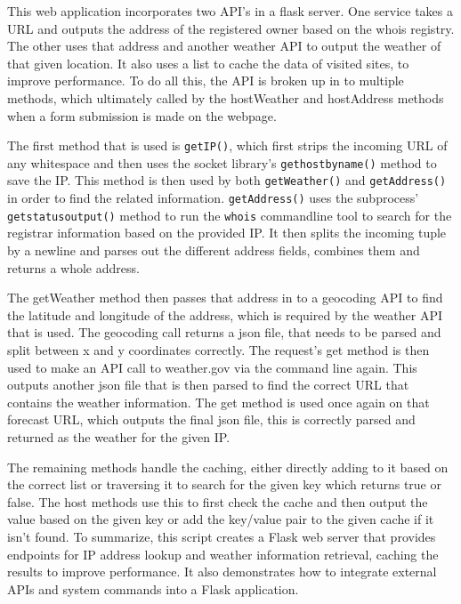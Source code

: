 	This web application incorporates two API's in a flask server. One service takes a URL and outputs the address of the registered owner based on the whois \cite{rfc3912} registry. The other uses that address and another weather API \cite{weather2009national,} to output the weather of that given location. It also uses a list to cache the data of visited sites, to improve performance. To do all this, the API is broken up in to multiple methods, which ultimately called by the hostWeather and hostAddress methods when a form submission is made on the webpage.
	
	The first method that is used is \verb+getIP()+, which first strips the incoming URL of any whitespace and then uses the socket library's \verb+gethostbyname()+ method to save the IP. This method is then used by both \verb+getWeather()+ and \verb+getAddress()+ in order to find the related information. \verb+getAddress()+ uses the subprocess' \verb+getstatusoutput()+ method to run the \verb+whois+ commandline tool to search for the registrar information based on the provided IP. It then splits the incoming tuple by a newline and parses out the different address fields, combines them and returns a whole address. 
	
	The getWeather method then passes that address in to a geocoding API to find the latitude and longitude of the address, which is required by the weather API that is used. The geocoding call returns a json file, that needs to be parsed and split between x and y coordinates correctly. The request's get method is then used to make an API call to weather.gov \cite{weather2009national} via the command line again. This outputs another json file that is then parsed to find the correct URL that contains the weather information. The get method is used once again on that forecast URL, which outputs the final json file, this is correctly parsed and returned as the weather for the given IP.

	The remaining methods handle the caching, either directly adding to it based on the correct list or traversing it to search for the given key which returns true or false. The host methods use this to first check the cache and then output the value based on the given key or add the key/value pair to the given cache if it isn't found. To summarize, this script creates a Flask web server that provides endpoints for IP address lookup and weather information retrieval, caching the results to improve performance. It also demonstrates how to integrate external APIs and system commands into a Flask application.


